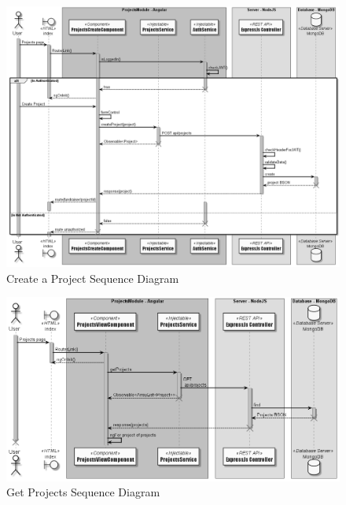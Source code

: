 \begin{figure}[!ht]
      \center
      \includegraphics[scale=0.35]{assets/PostProject.png}
      \caption{Create a Project Sequence Diagram}
      \label{fig:PostProject seq}

\end{figure}

\begin{figure}[!ht]
      \center
      \includegraphics[scale=0.40]{assets/projects.png}
      \caption{Get Projects Sequence Diagram}
      \label{fig:projects seq}

\end{figure}

